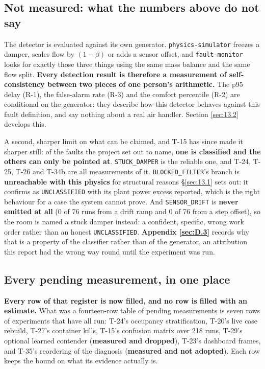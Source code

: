 \subsection{Not measured: what the numbers above do not say}\label{sec:11.5}

The detector is evaluated against its own generator. \texttt{physics-simulator} freezes a damper,
scales flow by $(1-\beta)$ or adds a sensor offset, and \texttt{fault-monitor} looks for exactly
those three things using the same mass balance and the same flow split. \textbf{Every detection
result is therefore a measurement of self-consistency between two pieces of one person's
arithmetic.} The p95 delay (R-1), the false-alarm rate (R-3) and the comfort percentile (R-2) are
conditional on the generator: they describe how this detector behaves against this fault
definition, and say nothing about a real air handler. Section \ref{sec:13.2} develops this.

A second, sharper limit on what can be claimed, and T-15 has since made it sharper still: of the
faults the project set out to name, \textbf{one is classified and the others can only be pointed at}.
\texttt{STUCK\_DAMPER} is the reliable one, and T-24, T-25, T-26 and T-34b are all measurements of
it. \texttt{BLOCKED\_FILTER}'s branch is \textbf{unreachable with this physics} for structural
reasons §\ref{sec:13.1} sets out: it confirms as \texttt{UNCLASSIFIED} with its plant power excess reported,
which is the right behaviour for a case the system cannot prove. And \texttt{SENSOR\_DRIFT} is
\textbf{never emitted at all} (0 of 76 runs from a drift ramp and 0 of 76 from a step offset),
so the room is named a stuck damper instead: a confident, specific, wrong work order rather than an
honest \texttt{UNCLASSIFIED}. \textbf{Appendix \ref{sec:D.3}} records why that is a property of the classifier
rather than of the generator, an attribution this report had the wrong way round until the experiment
was run.

\subsection{Every pending measurement, in one place}\label{sec:11.6}

\textbf{Every row of that register is now filled, and no row is filled with an estimate.} What was a
fourteen-row table of pending measurements is seven rows of experiments that have all run: T-24's
occupancy stratification, T-20's live case rebuild, T-27's container kills, T-15's confusion matrix
over 218 runs, T-29's optional learned contender (\textbf{measured and dropped}), T-23's
dashboard frames, and T-35's reordering of the diagnosis (\textbf{measured and not adopted}). Each
row keeps the bound on what its evidence actually is.

